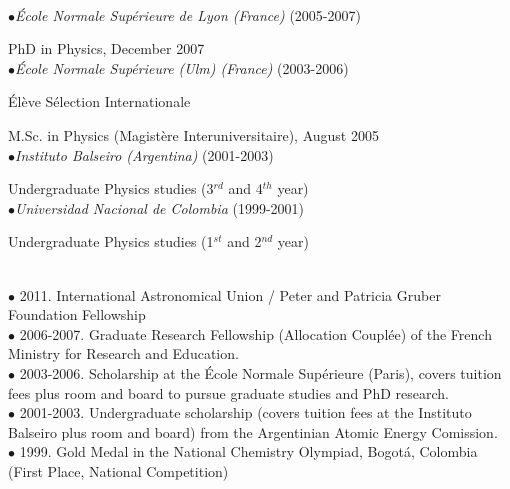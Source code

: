 \documentclass[10pt]{article}
\begin{document}
\\
\noindent\makebox[\linewidth]{\rule{\textwidth}{0.4pt}}%

\noindent$\bullet$\emph{\'Ecole Normale Sup\'erieure de Lyon (France)} (2005-2007)

PhD in Physics, December 2007\\

\noindent$\bullet$\emph{\'Ecole Normale Sup\'erieure (Ulm) (France)} (2003-2006)

  \'El\`eve S\'election Internationale

  M.Sc. in Physics (Magist\`ere Interuniversitaire), August 2005\\
  


\noindent$\bullet$\emph{Instituto Balseiro (Argentina)} (2001-2003)

  Undergraduate Physics studies (3$^{rd}$ and 4$^{th}$ year)\\

\noindent$\bullet$\emph{Universidad Nacional de Colombia} (1999-2001)

  Undergraduate Physics studies (1$^{st}$ and 2$^{nd}$ year)\\

\\
\noindent\makebox[\linewidth]{\rule{\textwidth}{0.4pt}}%


\noindent$\bullet$ 2011. International Astronomical Union / Peter and Patricia Gruber Foundation Fellowship\\

\noindent$\bullet$ 2006-2007. Graduate Research Fellowship (Allocation Coupl\'ee) of the French Ministry for Research and Education.\\

\noindent$\bullet$ 2003-2006. Scholarship at the \'Ecole Normale Sup\'erieure (Paris), covers tuition fees plus room and board to pursue graduate studies and PhD research. \\

\noindent$\bullet$ 2001-2003. Undergraduate scholarship (covers tuition fees at the Instituto Balseiro plus room and board) from the Argentinian Atomic Energy
  Comission. \\

\noindent$\bullet$ 1999. Gold Medal in the National Chemistry Olympiad, Bogot\'a, Colombia (First Place, National Competition)\\
\end{document}
